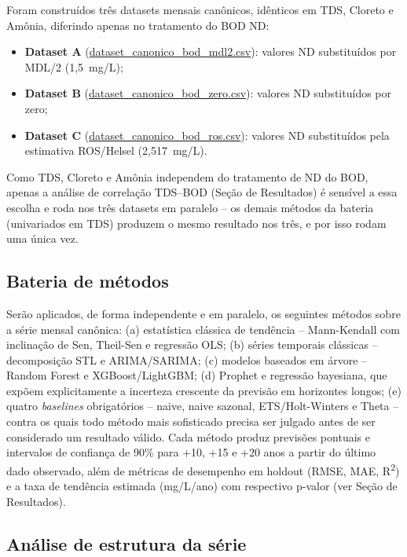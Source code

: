 Foram construídos três datasets mensais canônicos, idênticos em TDS, Cloreto e Amônia, diferindo apenas no tratamento do BOD ND:

\begin{itemize}
    \item \textbf{Dataset A} (\url{dataset_canonico_bod_mdl2.csv}): valores ND substituídos por MDL/2 (1,5~mg/L);
    \item \textbf{Dataset B} (\url{dataset_canonico_bod_zero.csv}): valores ND substituídos por zero;
    \item \textbf{Dataset C} (\url{dataset_canonico_bod_ros.csv}): valores ND substituídos pela estimativa ROS/Helsel (2,517~mg/L).
\end{itemize}

Como TDS, Cloreto e Amônia independem do tratamento de ND do BOD, apenas a análise de correlação TDS--BOD (Seção de Resultados) é sensível a essa escolha e roda nos três datasets em paralelo -- os demais métodos da bateria (univariados em TDS) produzem o mesmo resultado nos três, e por isso rodam uma única vez.

\subsection{Bateria de métodos}

Serão aplicados, de forma independente e em paralelo, os seguintes métodos sobre a série mensal canônica: (a) estatística clássica de tendência -- Mann-Kendall com inclinação de Sen, Theil-Sen e regressão OLS; (b) séries temporais clássicas -- decomposição STL e ARIMA/SARIMA; (c) modelos baseados em árvore -- Random Forest e XGBoost/LightGBM; (d) Prophet e regressão bayesiana, que expõem explicitamente a incerteza crescente da previsão em horizontes longos; (e) quatro \textit{baselines} obrigatórios -- naive, naive sazonal, ETS/Holt-Winters e Theta -- contra os quais todo método mais sofisticado precisa ser julgado antes de ser considerado um resultado válido. Cada método produz previsões pontuais e intervalos de confiança de 90\% para +10, +15 e +20 anos a partir do último dado observado, além de métricas de desempenho em holdout (RMSE, MAE, R\textsuperscript{2}) e a taxa de tendência estimada (mg/L/ano) com respectivo p-valor (ver Seção de Resultados).

\subsection{Análise de estrutura da série}

